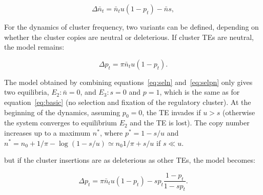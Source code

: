 \documentclass[10pt,a4paper]{article}
\begin{document}
\begin{equation}\label{eq:seln}
\Delta \bar n_t = \bar n_t u (1-p_t) - \bar n s,
\end{equation}

For the dynamics of cluster frequency, two variants can be defined, depending on whether the cluster copies are neutral or deleterious. If cluster TEs are neutral, the model remains:

\begin{equation}\label{eq:selpn}
\Delta p_t = \pi \bar n_t u (1-p_t).
\end{equation}

The model obtained by combining equations~\ref{eq:seln} and~\ref{eq:selpn} only gives two equilibria, $E_2: \bar n = 0$, and $E_3: s=0$ and $p=1$, which is the same as for equation~\ref{eq:basic} (no selection and fixation of the regulatory cluster). At the beginning of the dynamics, assuming $p_0 = 0$, the TE invades if $u > s$ (otherwise the system converges to equilibrium $E_2$ and the TE is lost). The copy number increases up to a maximum $n^\ast$, where $p^\ast = 1 - s/u$ and $n^\ast = n_0 + 1/\pi - \log (1-s/u) \simeq n_0 1/\pi + s/u$ if $s \ll u$. 

\noindent but if the cluster insertions are as deleterious as other TEs, the model becomes:

\begin{equation}\label{eq:selps}
\Delta p_t = \pi \bar n_t u (1-p_t) - s p_t \frac{1-p_t}{1- s p_t}.
\end{equation}
\end{document}
